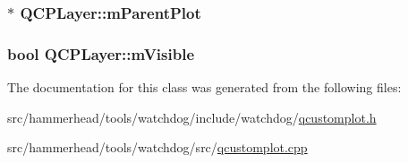 \subsubsection[{\texorpdfstring{m\+Parent\+Plot}{mParentPlot}}]{$\ast$ Q\+C\+P\+Layer\+::m\+Parent\+Plot\hspace{0.3cm}{\ttfamily [protected]}}\hypertarget{classQCPLayer_a2f3374a7884bf403720cd1cf6f7ad1bb}{}\label{classQCPLayer_a2f3374a7884bf403720cd1cf6f7ad1bb}
\subsubsection[{\texorpdfstring{m\+Visible}{mVisible}}]{\setlength{\rightskip}{0pt plus 5cm}bool Q\+C\+P\+Layer\+::m\+Visible\hspace{0.3cm}{\ttfamily [protected]}}\hypertarget{classQCPLayer_a264950deb08e589460c126c895a1e2b5}{}\label{classQCPLayer_a264950deb08e589460c126c895a1e2b5}


The documentation for this class was generated from the following files\+:\begin{DoxyCompactItemize}
\item 
src/hammerhead/tools/watchdog/include/watchdog/\hyperlink{qcustomplot_8h}{qcustomplot.\+h}\item 
src/hammerhead/tools/watchdog/src/\hyperlink{qcustomplot_8cpp}{qcustomplot.\+cpp}\end{DoxyCompactItemize}
